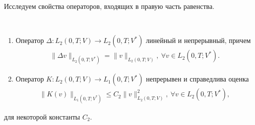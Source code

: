 Исследуем свойства операторов, входящих в правую часть равенства.
\begin{lemma} ~\\
    \begin{enumerate}
        \item Оператор $\Delta: L_2(0, T; V) \rightarrow L_2(0, T; V^\ast)$ линейный и\linebreak
        непрерывный, причем
        \begin{equation}\label{eq:5.9}
            \begin{gathered}
                \| \Delta v \|_{L_2(0, T; V^\ast)} = \| v \|_{L_2(0, T; V)}, \ \forall v \in L_2(0, T; V^\ast).
            \end{gathered}
        \end{equation}
        \item Оператор $K: L_2(0, T; V) \rightarrow L_1(0, T; V^\ast)$ непрерывен и справедлива оценка
        \begin{equation}\label{eq:5.10}
            \begin{gathered}
                \| K(v) \|_{L_1(0, T; V^\ast)} \leqslant C_2\| v \|^2_{L_2(0, T;V)}, \ \forall v \in L_2(0, T; V^\ast),
            \end{gathered}
        \end{equation}
    \end{enumerate}
    для некоторой константы $C_2$.
\end{lemma}

